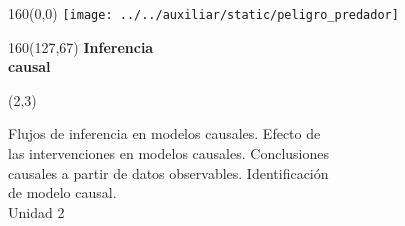 \documentclass[shownotes,aspectratio=169]{beamer}
\begin{document}
\color{black!85}
\large


\begin{frame}

\begin{textblock}{160}(0,0)
\texttt{[image: ../../auxiliar/static/peligro\_predador]}
\end{textblock}

\begin{textblock}{160}(127,67)
\LARGE \textcolor{black!5}{\fontsize{22}{0}\selectfont \textbf{Inferencia  \\[-0.1cm] \hspace{0.5cm} causal}}
\end{textblock}

\begin{textblock}{55}(2,3)
\begin{turn}{0}
\parbox{15cm}{\small
\textcolor{black!95}{Flujos de inferencia en modelos causales. Efecto de}\\
\textcolor{black!95}{las intervenciones en modelos causales. Conclusiones} \\
\textcolor{black!95}{causales a partir de datos observables. Identificación} \\
\textcolor{black!95}{de modelo causal.} \\
\normalsize\textcolor{black!95}{Unidad 2} \\
}
\end{turn}
\end{textblock}

\end{frame}
\end{document}
